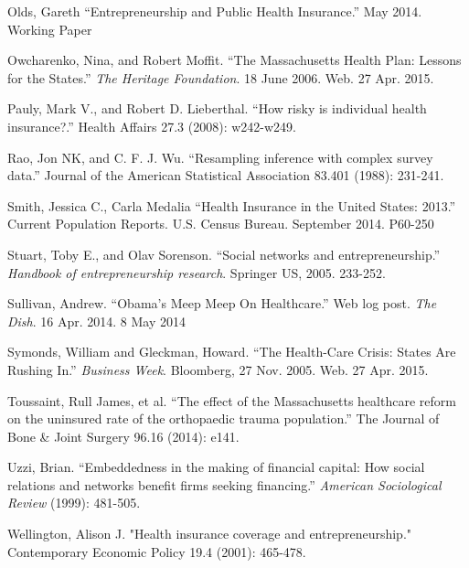 \documentclass[12pt]{article}
\begin{document}
\begin{thebibliography}{99}
Olds, Gareth ``Entrepreneurship and Public Health Insurance.'' May 2014. Working Paper

Owcharenko, Nina, and Robert Moffit. ``The Massachusetts Health Plan: Lessons for the States.'' \emph{The Heritage Foundation}. 18 June 2006. Web. 27 Apr. 2015.

Pauly, Mark V., and Robert D. Lieberthal. ``How risky is individual health insurance?.'' Health Affairs 27.3 (2008): w242-w249.

Rao, Jon NK, and C. F. J. Wu. ``Resampling inference with complex survey data.'' Journal of the American Statistical Association 83.401 (1988): 231-241.

Smith, Jessica C., Carla Medalia ``Health Insurance in the United States: 2013.'' Current Population Reports. U.S. Census Bureau. September 2014. P60-250

Stuart, Toby E., and Olav Sorenson. ``Social networks and entrepreneurship.'' \emph{Handbook of entrepreneurship research}. Springer US, 2005. 233-252.

Sullivan, Andrew. ``Obama's Meep Meep On Healthcare.'' Web log post. \emph{The Dish}. 16 Apr. 2014. 8 May 2014 

Symonds, William and Gleckman, Howard.  ``The Health-Care Crisis: States Are Rushing In.'' \emph{Business Week}. Bloomberg, 27 Nov. 2005. Web. 27 Apr. 2015.

Toussaint, Rull James, et al. ``The effect of the Massachusetts healthcare reform on the uninsured rate of the orthopaedic trauma population.'' The Journal of Bone \& Joint Surgery 96.16 (2014): e141.

Uzzi, Brian. ``Embeddedness in the making of financial capital: How social relations and networks benefit firms seeking financing.'' \emph{American Sociological Review} (1999): 481-505.

Wellington, Alison J. "Health insurance coverage and entrepreneurship." Contemporary Economic Policy 19.4 (2001): 465-478.

\begin{comment}


\bibitem{acharya}
Acharya, Viral, and Krishnamurthy Subramanian, 2009, Bankruptcy codes and innovation, \emph{Review of Financial Studies} 22, 4949-4988.

\bibitem{kaufman}
Atkinson, Robert D., Scott Andes. 2010 ``The 2010 State New Economy Index: Benchmarking Economic Transformation in the States'' The Information Technology and Innovation Foundation, Kauffman Foundation



\end{comment}
\end{thebibliography}
\end{document}
